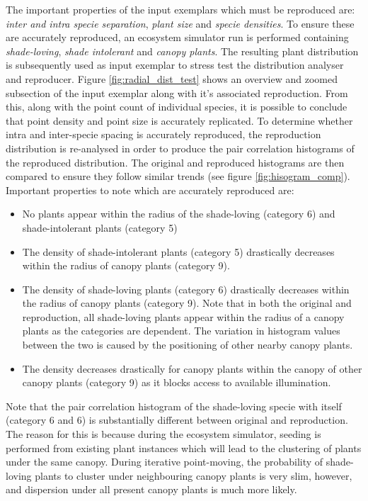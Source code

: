 The important properties of the input exemplars which must be reproduced are: \textit{inter and intra specie separation}, \textit{plant size} and \textit{specie densities}. To ensure these are accurately reproduced, an ecosystem simulator run is performed containing \textit{shade-loving}, \textit{shade intolerant} and \textit{canopy plants}. The resulting plant distribution is subsequently used as input exemplar to stress test the distribution analyser and reproducer. Figure \ref{fig:radial_dist_test} shows an overview and zoomed subsection of the input exemplar along with it's associated reproduction. From this, along with the point count of individual species, it is possible to conclude that point density and point size is accurately replicated. To determine whether intra and inter-specie spacing is accurately reproduced, the reproduction distribution is re-analysed in order to produce the pair correlation histograms of the reproduced distribution. The original and reproduced histograms are then compared to ensure they follow similar trends (see figure \ref{fig:hisogram_comp}). Important properties to note which are accurately reproduced are:
\begin{itemize}
\item No plants appear within the radius of the shade-loving (category 6) and shade-intolerant plants (category 5)
\item The density of shade-intolerant plants (category 5) drastically decreases within the radius of canopy plants (category 9).
\item The density of shade-loving plants (category 6) drastically decreases within the radius of canopy plants (category 9). Note that in both the original and reproduction, all shade-loving plants appear within the radius of a canopy plants as the categories are dependent. The variation in histogram values between the two is caused by the positioning of other nearby canopy plants.
\item The density decreases drastically for canopy plants within the canopy of other canopy plants (category 9) as it blocks access to available illumination.
\end{itemize}

Note that the pair correlation histogram of the shade-loving specie with itself (category 6 and 6) is substantially different between original and reproduction. The reason for this is because during the ecosystem simulator, seeding is performed from existing plant instances which will lead to the clustering of plants under the same canopy. During iterative point-moving, the probability of shade-loving plants to cluster under neighbouring canopy plants is very slim, however, and dispersion under all present canopy plants is much more likely.

